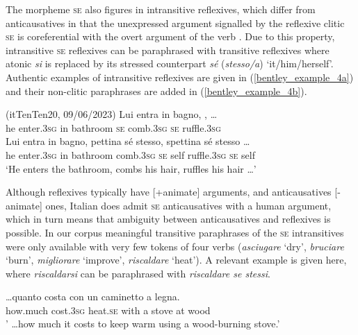 \documentclass[output=paper,colorlinks,citecolor=brown
]{langscibook}
\begin{document}
The morpheme \textsc{se} also figures in intransitive reflexives, which differ from anticausatives in that the unexpressed argument signalled by the reflexive clitic \textsc{se} is coreferential with the overt argument of the verb \citep[257, 126—136]{vanvalin1990semantic,bentley2006split}. Due to this property, intransitive \textsc{se} reflexives can be paraphrased with transitive reflexives where atonic \textit{si} is replaced by its stressed counterpart \textit{sé} (\textit{stesso/a}) ‘it/him/herself’. Authentic examples of intransitive reflexives are given in (\ref{bentley_example_4a}) and their non-clitic paraphrases are added in (\ref{bentley_example_4b}).


\hspace*{\fill}(itTenTen20, 09/06/2023)\quad
\ea \label{bentley_example_4}
    \ea \label{bentley_example_4a}
    \gll Lui entra in bagno,  ,   \ldots  \\
    he enter.3\textsc{sg} in bathroom \textsc{se} comb.3\textsc{sg} \textsc{se} ruffle.3\textsc{sg} \\
    \ex \label{bentley_example_4b}
    \gll Lui entra in bagno, pettina sé stesso, spettina sé stesso \ldots  \\
    he enter.3\textsc{sg} in bathroom comb.3\textsc{sg} \textsc{se} self ruffle.3\textsc{sg} \textsc{se} self  \\
    \glt ‘He enters the bathroom, combs his hair, ruffles his hair  \ldots ’  \\
    \z
\z

Although reflexives typically have [+animate] arguments, and anticausatives [-animate] ones, Italian does admit \textsc{se} anticausatives with a human argument, which in turn means that ambiguity between anticausatives and reflexives is possible. In our corpus meaningful transitive paraphrases of the \textsc{se} intransitives were only available with very few tokens of four verbs (\textit{asciugare} ‘dry’, \textit{bruciare} ‘burn’, \textit{migliorare} ‘improve’, \textit{riscaldare} ‘heat’). A relevant example is given here, where \textit{riscaldarsi} can be paraphrased with \textit{riscaldare se stessi}.

\ea \label{bentley_example_5}
\gll  \ldots  quanto costa  con un caminetto a legna. \\
    how.much	cost.3\textsc{sg} heat.\textsc{se} with a stove at wood \\
\glt ' \ldots  how much it costs to keep warm using a wood-burning stove.’
\z
\end{document}
